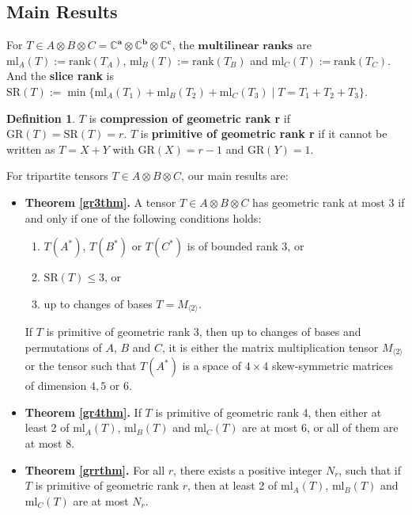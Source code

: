 \documentclass[10pt]{article} %
\newcommand{\aaa}{\mathbf{a}}
\newcommand{\bbb}{\mathbf{b}}
\newcommand{\ccc}{\mathbf{c}}
\newcommand{\GR}{\mathrm{GR}}
\newcommand{\SR}{\mathrm{SR}}
\newcommand{\ml}{\mathrm{ml}}
\newcommand{\BC}{\mathbb{C}}
\newcommand{\ot}{\otimes}
\theoremstyle{definition}
\newtheorem{defn}[thm]{Definition}
\begin{document}
\subsection{Main Results}
For $T\in A\otimes B\otimes C=\BC^{\aaa}\otimes\BC^{\bbb}\otimes\BC^{\ccc}$, the $\textbf{multilinear ranks}$ are $\ml_A(T):=\mathrm{rank}(T_A)$, $\ml_B(T):=\mathrm{rank}(T_B)$ and $\ml_C(T):=\mathrm{rank}(T_C)$. And the \textbf{slice rank} is $\SR(T):=\min\{\ml_A(T_1)+\ml_B(T_2)+\ml_C(T_3)\mid T=T_1+T_2+T_3\}$.

\begin{defn}\label{primitivedef}
$T$ is \textbf{compression of geometric rank r} if $\GR(T)=\SR(T)=r$. $T$ is \textbf{primitive of geometric rank r} if it cannot be written as $T=X+Y$ with $\GR(X)=r-1$ and $\GR(Y)=1$.
\end{defn}

For tripartite tensors $T\in A\ot B\ot C$, our main results are:
\begin{itemize}
    \item \textbf{Theorem \ref{gr3thm}.} 
    A tensor $T\in A\ot B\ot C$ has geometric rank at most 3 if and only if one of the following conditions holds:
    \begin{enumerate}
        \item $T(A^*)$, $T(B^*)$ or $T(C^*)$ is of bounded rank $3$, or
        \item $\mathrm{SR}(T)\leq 3$, or
        \item up to changes of bases $T=M_{\langle 2\rangle}$.
    \end{enumerate}
    
    If $T$ is primitive of geometric rank 3, then up to changes of bases and permutations of $A$, $B$ and $C$, it is either the matrix multiplication tensor $M_{\langle 2\rangle}$ or the tensor such that $T(A^*)$ is a space of $4\times 4$ skew-symmetric matrices of dimension $4,5$ or $6$.
    

    
    \item \textbf{Theorem \ref{gr4thm}.} If $T$ is primitive of geometric rank 4, then either at least 2 of $\ml_A(T)$, $\ml_B(T)$ and $\ml_C(T)$ are at most 6, or all of them are at most 8.
    
    \item \textbf{Theorem \ref{grrthm}.} For all $r$, there exists a positive integer $N_r$, such that if $T$ is primitive of geometric rank $r$, then at least 2 of $\ml_A(T)$, $\ml_B(T)$ and $\ml_C(T)$ are at most $N_r$.
\end{itemize}
\end{document}

